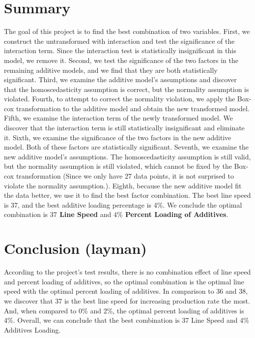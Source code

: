 \documentclass[11pt,a4paper]{article}
\begin{document}
\section{Summary}
The goal of this project is to find the best combination of two variables. First, we construct the untransformed with interaction and test the significance of the interaction term. Since the interaction test is statistically insignificant in this model, we remove it. Second, we test the significance of the two factors in the remaining additive models, and we find that they are both statistically significant. Third, we examine the additive model's assumptions and discover that the homoscedasticity assumption is correct, but the normality assumption is violated. Fourth, to attempt to correct the normality violation, we apply the Box-cox transformation to the additive model and obtain the new transformed model. Fifth, we examine the interaction term of the newly transformed model. We discover that the interaction term is still statistically insignificant and eliminate it. Sixth, we examine the significance of the two factors in the new additive model. Both of these factors are statistically significant. Seventh, we examine the new additive model's assumptions. The homoscedasticity assumption is still valid, but the normality assumption is still violated, which cannot be fixed by the Box-cox transformation (Since we only have 27 data points, it is not surprised to violate the normality assumption.). Eighth, because the new additive model fit the data better, we use it to find the best factor combination. The best line speed is 37, and the best additive loading percentage is 4\%. We conclude the optimal combination is \textbf{$37$ Line Speed} and \textbf{$4\%$ Percent Loading of Additives}.

\section{Conclusion (layman)}
According to the project's test results, there is no combination effect of line speed and percent loading of additives, so the optimal combination is the optimal line speed with the optimal percent loading of additives. In comparison to 36 and 38, we discover that 37 is the best line speed for increasing production rate the most. And, when compared to 0\% and 2\%, the optimal percent loading of additives is 4\%. Overall, we can conclude that the best combination is 37 Line Speed and 4\% Additives Loading.
\end{document}
